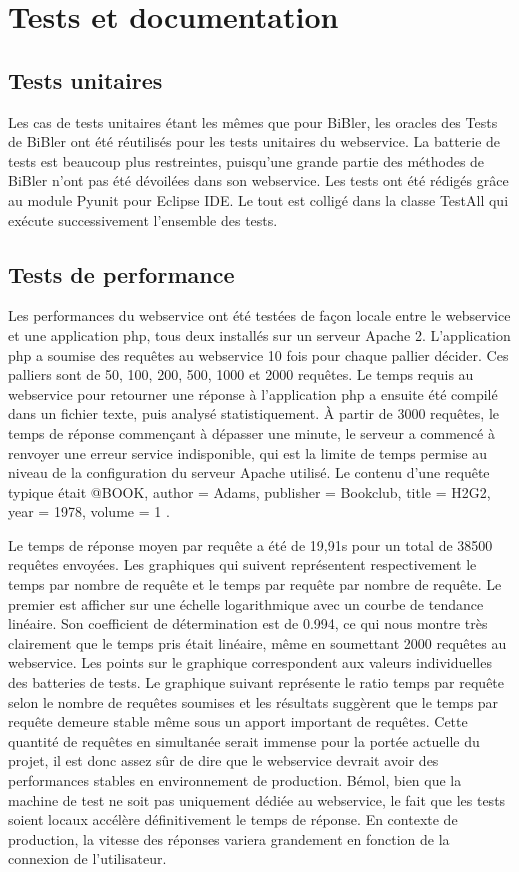\documentclass[12pt,titlepage]{article}
\let\oldsection\section
\renewcommand\section{\clearpage\oldsection}
\begin{document}
\section{Tests et documentation}
\subsection{Tests unitaires}
Les cas de tests unitaires étant les mêmes que pour BiBler, les oracles des Tests de BiBler ont été réutilisés pour les tests unitaires du webservice. La batterie de tests est beaucoup plus restreintes, puisqu'une grande partie des méthodes de BiBler n'ont pas été dévoilées dans son webservice. Les tests ont été rédigés grâce au module Pyunit pour Eclipse IDE. Le tout est colligé dans la classe TestAll qui exécute successivement l'ensemble des tests. \newline
\subsection{Tests de performance}
Les performances du webservice ont été testées de façon locale entre le webservice et une application php, tous deux installés sur un serveur Apache 2. L'application php a soumise des requêtes au webservice 10 fois pour chaque pallier décider. Ces palliers sont de 50, 100, 200, 500, 1000 et 2000 requêtes. Le temps requis au webservice pour retourner une réponse à l'application php a ensuite été compilé dans un fichier texte, puis analysé statistiquement. À partir de 3000 requêtes, le temps de réponse commençant à dépasser une minute, le serveur a commencé à renvoyer une erreur service indisponible, qui est la limite de temps permise au niveau de la configuration du serveur Apache utilisé. Le contenu d'une requête typique était @BOOK{, author = {Adams}, publisher = {Bookclub}, title = {H2G2}, year = {1978}, volume = {1} }. \newline

Le temps de réponse moyen par requête a été de 19,91s pour un total de 38500 requêtes envoyées. Les graphiques qui suivent représentent respectivement le temps par nombre de requête et le temps par requête par nombre de requête. Le premier est afficher sur une échelle logarithmique avec un courbe de tendance linéaire. Son coefficient de détermination est de 0.994, ce qui nous montre très clairement que le temps pris était linéaire, même en soumettant 2000 requêtes au webservice. Les points sur le graphique correspondent aux valeurs individuelles des batteries de tests. Le graphique suivant représente le ratio temps par requête selon le nombre de requêtes soumises et les résultats suggèrent que le temps par requête demeure stable même sous un apport important de requêtes. Cette quantité de requêtes en simultanée serait immense pour la portée actuelle du projet, il est donc assez sûr de dire que le webservice devrait avoir des performances stables en environnement de production. Bémol, bien que la machine de test ne soit pas uniquement dédiée au webservice, le fait que les tests soient locaux accélère définitivement le temps de réponse. En contexte de production, la vitesse des réponses variera grandement en fonction de la connexion de l'utilisateur. \newline
\end{document}
